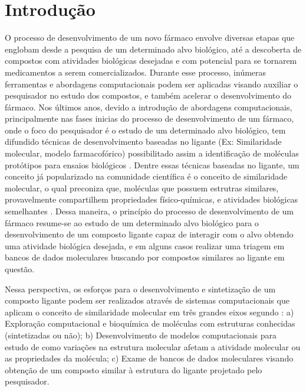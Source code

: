 \chapter{Introdu\c{c}\~ao}
O processo de desenvolvimento de um novo fármaco envolve diversas etapas que englobam desde a pesquisa de um determinado alvo biológico, até a descoberta de compostos com atividades biológicas desejadas e com potencial para se tornarem medicamentos a serem comercializados. Durante esse processo, inúmeras ferramentas e abordagens computacionais podem ser aplicadas visando auxiliar o pesquisador no estudo dos compostos, e também acelerar o desenvolvimento do fármaco. Nos últimos anos, devido a introdução de abordagens computacionais, principalmente nas fases inicias do processo de desenvolvimento de um fármaco, onde o foco do pesquisador é o estudo de um determinado alvo biológico,  tem difundido técnicas de desenvolvimento baseadas no ligante (Ex: Similaridade molecular, modelo farmacofórico) possibilitado assim a identificação de moléculas protótipos para ensaios biológicos \cite{rodrigues2012}. Dentre essas técnicas baseadas no ligante, um conceito já popularizado na comunidade científica é o conceito de similaridade molecular, o qual preconiza que, moléculas que possuem estrutras similares, provavelmente compartilhem propriedades físico-químicas, e atividades biológicas semelhantes \cite{singh2004reasoning}. Dessa maneira, o princípio do processo de desenvolvimento de um fármaco resume-se ao estudo de um determinado alvo biológico para o desenvolvimento de um composto ligante capaz de interagir com o alvo obtendo uma atividade biológica desejada, e em alguns casos realizar uma triagem em bancos de dados moleculares buscando por compostos similares ao ligante em questão.

Nessa perspectiva, os esforços para o desenvolvimento e sintetização de um composto ligante podem ser realizados através de sistemas computacionais que aplicam o conceito de similaridade molecular em três grandes eixos segundo \cite{kubinyi2008virtual}: a) Exploração computacional e bioquímica de moléculas com estruturas conhecidas (sintetizadas ou não); b) Desenvolvimento de modelos computacionais para estudo de como variações na estrutura molecular afetam a atividade molecular ou as propriedades da molécula; c) Exame de bancos de dados moleculares visando obtenção de um composto similar à estrutura do ligante projetado pelo pesquisador. 

